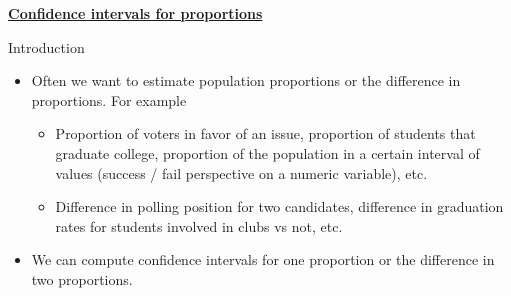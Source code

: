 \documentclass{article}
\newcommand{\bu}[1]{\textbf{\ul{#1}}}				%
\begin{document}
\bu{Confidence intervals for proportions}\bigskip

Introduction\bigskip
\begin{itemize}
    \item Often we want to estimate population proportions or the difference in proportions. For example
    \begin{itemize}
        \item Proportion of voters in favor of an issue, proportion of students that graduate college, proportion of the population in a certain interval of values (success / fail perspective on a numeric variable), etc.
        \item Difference in polling position for two candidates, difference in graduation rates for students involved in clubs vs not, etc.
    \end{itemize}
    \item We can compute confidence intervals for one proportion or the difference in two proportions.
\end{itemize}\bigskip
\end{document}
